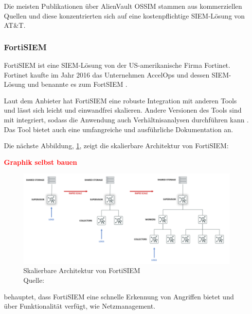 Die meisten Publikationen über AlienVault OSSIM stammen aus kommerziellen Quellen und diese konzentrierten sich auf eine kostenpflichtige \gls{SIEM}-Lösung von AT\&T.

\subsubsection{FortiSIEM}
FortiSIEM ist eine \gls{SIEM}-Lösung von der US-amerikanische Firma Fortinet. Fortinet kaufte im Jahr 2016 das Unternehmen AccelOps und dessen \gls{SIEM}-Lösung und benannte es zum FortSIEM \citep{Fortinet_Press}. 

Laut dem Anbieter hat FortiSIEM eine robuste Integration mit anderen Tools und lässt sich leicht und einwandfrei skalieren. Andere Versionen des Tools sind mit  integriert, sodass die Anwendung auch Verhältnisanalysen durchführen kann \citep{Fortinet_Solutions}. Das Tool bietet auch eine umfangreiche und ausführliche Dokumentation an. 

Die nächste Abbildung, \ref{fig:FortiSIEM}, zeigt die skalierbare Architektur von FortiSIEM:

\textbf{\textcolor{red}{Graphik selbst bauen}}

\begin{figure}[H]
   \centering
   \includegraphics[width=1\textwidth]{assets/2_p7.png}
   \caption[Skalierbare Architektur von FortiSIEM]
   {Skalierbare Architektur von FortiSIEM \\Quelle: \citep{Fortinet_Arch} }
   \label{fig:FortiSIEM}
   \centering
\end{figure}


\newpage 
\citep{Ramires_fortisiem} behauptet, dass FortiSIEM eine schnelle Erkennung von Angriffen bietet und über  Funktionalität verfügt, wie Netzmanagement. 

